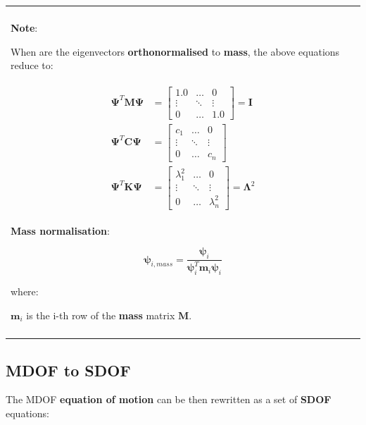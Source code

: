 \documentclass[10pt,b5paper,titlepage]{book}
\newenvironment{bbox}[1][0.96]
{
    \begin{center}
        \begin{tabular}{|p{#1\textwidth}|}
            \hline\\
}
{
            \\\\\hline
        \end{tabular}
    \end{center}
}
\newenvironment{eqarray}
{
    \begin{eqnarray}
        \begin{aligned}
}
{
        \end{aligned}
    \end{eqnarray}
}
\begin{document}
\begin{bbox}[0.96]
    \textbf{Note}:

    When are the eigenvectors \textbf{orthonormalised} to \textbf{mass}, the above
    equations reduce to:

    \begin{eqarray}
        \mathbf{\Psi}^T \mathbf{M} \mathbf{\Psi}
        &= \begin{bmatrix}
            1.0 & \dots & 0 \\
            \vdots & \ddots & \vdots \\
            0 & \dots & 1.0
        \end{bmatrix} = \mathbf{I} \\
        \mathbf{\Psi}^T \mathbf{C} \mathbf{\Psi}
        &= \begin{bmatrix}
            c_1 & \dots & 0 \\
            \vdots & \ddots & \vdots \\
            0 & \dots & c_n
        \end{bmatrix} \\
        \mathbf{\Psi}^T \mathbf{K} \mathbf{\Psi}
        &= \begin{bmatrix}
            \lambda_1^2 & \dots & 0 \\
            \vdots & \ddots & \vdots \\
            0 & \dots & \lambda_n^2
        \end{bmatrix} = \mathbf{\Lambda}^2
    \end{eqarray}

    \textbf{Mass normalisation}:

    \begin{equation}
        \mathbf{\psi}_{i,mass} = \frac{\mathbf{\psi}_i}{\mathbf{\psi}_i^T \mathbf{m}_i \mathbf{\psi}_i}
    \end{equation}

    where:

    $ \mathbf{m}_i $ is the i-th row of the \textbf{mass} matrix $ \mathbf{M} $.

\end{bbox}


\subsection{MDOF to SDOF}

The MDOF \textbf{equation of motion} can be then rewritten as a set of \textbf{SDOF}
equations:
\end{document}
